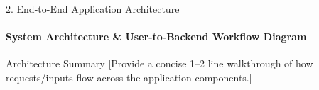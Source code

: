 \documentclass[aspectratio=169, 11pt]{beamer}
\begin{document}
\begin{frame}{2. End-to-End Application Architecture}
    \framesubtitle{System Architecture \& User-to-Backend Workflow Diagram}
    \centering
    \vspace{0.2cm}

    \begin{block}{Architecture Summary}
        \footnotesize {[Provide a concise 1--2 line walkthrough of how requests/inputs flow across the application components.]}
    \end{block}
\end{frame}
\end{document}
